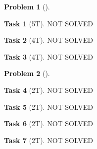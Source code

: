 \documentclass[11pt,twoside]{article}
\theoremstyle{definition}
\newtheorem{amsproblem}{Problem}
\newtheorem{amssubproblem}{Task}[amsproblem]
\newenvironment{problem}[1][]{%
  \begin{amsproblem}[#1]
  }{%
  \end{amsproblem}
}
\newenvironment{subproblem}[1][]{%
  \begin{amssubproblem}[#1]
  }{%
  \end{amssubproblem}
}
\newcommand{\TP}[1]{#1T}
\begin{document}
\noindent
\hrulefill

\begin{problem}
  \begin{subproblem}[\TP{5}]
    NOT SOLVED %
  \end{subproblem}
  \begin{subproblem}[\TP{4}]
    NOT SOLVED %
  \end{subproblem}
  \begin{subproblem}[\TP{4}]
    NOT SOLVED %
  \end{subproblem}
\end{problem}

\noindent
\hrulefill

\begin{problem}
  \begin{subproblem}[\TP{2}]
    NOT SOLVED %
  \end{subproblem}
  \begin{subproblem}[\TP{2}]
    NOT SOLVED %
  \end{subproblem}
  \begin{subproblem}[\TP{2}]
    NOT SOLVED %
  \end{subproblem}
  \begin{subproblem}[\TP{2}]
    NOT SOLVED %
  \end{subproblem}  
\end{problem}
\end{document}
